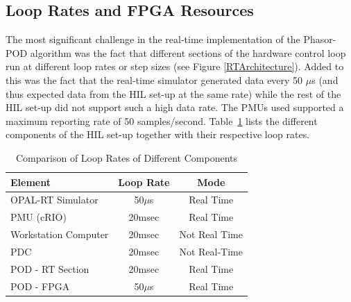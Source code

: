\documentclass[journal]{IEEEtran}
\begin{document}
\subsection{Loop Rates and FPGA Resources}\label{looprate}
The most significant challenge in the real-time implementation of the Phasor-POD algorithm was the fact that different sections of the hardware control loop run at different loop rates or step sizes (see Figure \ref{RTArchitecture}). Added to this was the fact that the real-time simulator generated data every 50 $\mu$s (and thus expected data from the HIL set-up at the same rate) while the rest of the HIL set-up did not support such a high data rate. The PMUs used supported a maximum reporting rate of 50 samples/second. Table~\ref{ex:LoopRates} lists the different components of the HIL set-up together with their respective loop rates.
\begin{table}[!ht]
\caption{Comparison of Loop Rates of Different Components}\label{ex:LoopRates}
\begin{center}
\begin{tabular}{|l|c|c|}
\hline \textbf{Element} & \textbf{Loop Rate} & \textbf{Mode} \\
\hline OPAL-RT Simulator & 50$\mu$s & Real Time \\ 
\hline PMU (cRIO) & 20msec & Real Time \\ 
\hline Workstation Computer& 20msec & Not Real Time \\ 
\hline PDC & 20msec & Not Real-Time \\ %
\hline POD - RT Section & 20msec & Real Time \\ 
\hline POD - FPGA & 50$\mu$s & Real Time \\ 
\hline 
\end{tabular}
\end{center}
\end{table} 
\end{document}
